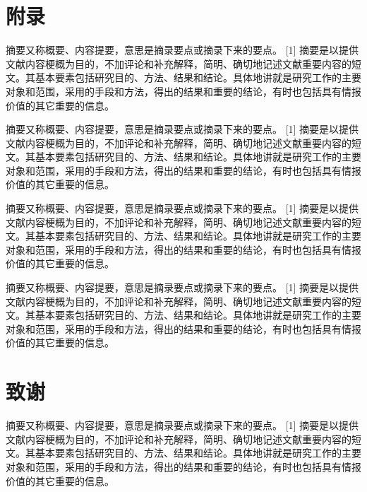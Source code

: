\documentclass[12pt,oneside,a4paper,fleqn]{ctexart}
\begin{document}
\vspace{0.5em} \section*{\heiti 附录} \vspace{0.5em}\begin{spacing}{1.25}
摘要又称概要、内容提要，意思是摘录要点或摘录下来的要点。 [1]  摘要是以提供文献内容梗概为目的，不加评论和补充解释，简明、确切地记述文献重要内容的短文。其基本要素包括研究目的、方法、结果和结论。具体地讲就是研究工作的主要对象和范围，采用的手段和方法，得出的结果和重要的结论，有时也包括具有情报价值的其它重要的信息。

摘要又称概要、内容提要，意思是摘录要点或摘录下来的要点。 [1]  摘要是以提供文献内容梗概为目的，不加评论和补充解释，简明、确切地记述文献重要内容的短文。其基本要素包括研究目的、方法、结果和结论。具体地讲就是研究工作的主要对象和范围，采用的手段和方法，得出的结果和重要的结论，有时也包括具有情报价值的其它重要的信息。

摘要又称概要、内容提要，意思是摘录要点或摘录下来的要点。 [1]  摘要是以提供文献内容梗概为目的，不加评论和补充解释，简明、确切地记述文献重要内容的短文。其基本要素包括研究目的、方法、结果和结论。具体地讲就是研究工作的主要对象和范围，采用的手段和方法，得出的结果和重要的结论，有时也包括具有情报价值的其它重要的信息。

摘要又称概要、内容提要，意思是摘录要点或摘录下来的要点。 [1]  摘要是以提供文献内容梗概为目的，不加评论和补充解释，简明、确切地记述文献重要内容的短文。其基本要素包括研究目的、方法、结果和结论。具体地讲就是研究工作的主要对象和范围，采用的手段和方法，得出的结果和重要的结论，有时也包括具有情报价值的其它重要的信息。
\end{spacing}\vspace{0.5em} \section*{\heiti 致谢} \vspace{0.5em}\begin{spacing}{1.25}
摘要又称概要、内容提要，意思是摘录要点或摘录下来的要点。 [1]  摘要是以提供文献内容梗概为目的，不加评论和补充解释，简明、确切地记述文献重要内容的短文。其基本要素包括研究目的、方法、结果和结论。具体地讲就是研究工作的主要对象和范围，采用的手段和方法，得出的结果和重要的结论，有时也包括具有情报价值的其它重要的信息。
\end{spacing}
\end{document}
